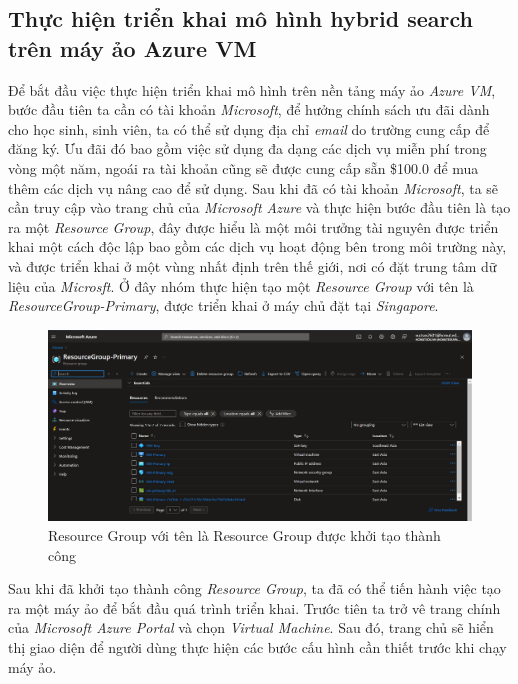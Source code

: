 \subsection{Thực hiện triển khai mô hình hybrid search trên máy ảo Azure VM}
\hspace*{1cm}
Để bắt đầu việc thực hiện triển khai mô hình trên nền tảng máy ảo \textit{Azure VM}, bước đầu tiên ta cần có tài khoản \textit{Microsoft}, để hưởng chính sách ưu đãi dành cho học sinh, sinh viên, ta có thể sử dụng địa chỉ \textit{email} do trường cung cấp để đăng ký. Ưu đãi đó bao gồm việc sử dụng đa dạng các dịch vụ miễn phí trong vòng một năm, ngoái ra tài khoản cũng sẽ được cung cấp sẵn \$100.0 để mua thêm các dịch vụ nâng cao để sử dụng. Sau khi đã có tài khoản \textit{Microsoft}, ta sẽ cần truy cập vào trang chủ của \textit{Microsoft Azure} và thực hiện bước đầu tiên là tạo ra một \textit{Resource Group}, đây được hiểu là một môi trưởng tài nguyên được triển khai một cách độc lập bao gồm các dịch vụ hoạt động bên trong môi trường này, và được triển khai ở một vùng nhất định trên thế giới, nơi có đặt trung tâm dữ liệu của \textit{Microsft}. Ở đây nhóm thực hiện tạo một \textit{Resource Group} với tên là \textit{ResourceGroup-Primary}, được triển khai ở máy chủ đặt tại \textit{Singapore}.
\begin{figure}[H]
    \centering
    \includegraphics[width=1\textwidth]{Images/Deployment/HybridSearch/ResrouceGroup.png}
    \caption{Resource Group với tên là Resource Group được khởi tạo thành công}
\end{figure}
\hspace*{1cm}
Sau khi đã khởi tạo thành công \textit{Resource Group}, ta đã có thể tiến hành việc tạo ra một máy ảo để bắt đầu quá trình triển khai. Trước tiên ta trở vê trang chính của \textit{Microsoft Azure Portal} và chọn \textit{Virtual Machine}. Sau đó, trang chủ sẽ hiển thị giao diện để người dùng thực hiện các bước cấu hình cần thiết trước khi chạy máy ảo.
